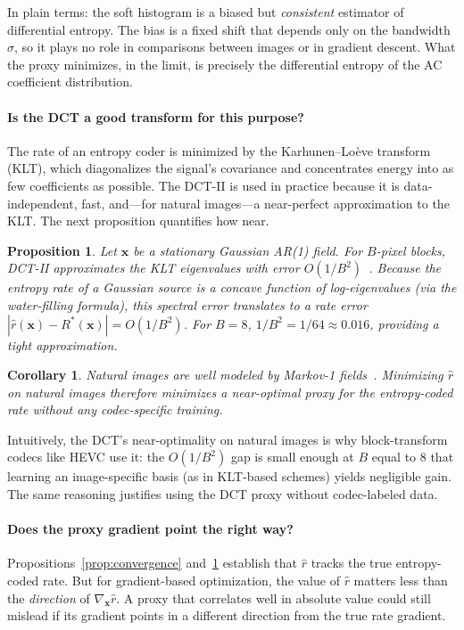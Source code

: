 \documentclass{article}
\newtheorem{proposition}{Proposition}
\newtheorem{corollary}{Corollary}
\theoremstyle{definition}
\newcommand{\bx}{\boldsymbol{x}}
\begin{document}
In plain terms: the soft histogram is a biased but \emph{consistent} estimator of differential entropy.
The bias is a fixed shift that depends only on the bandwidth $\sigma$, so it plays no role in comparisons between images or in gradient descent.
What the proxy minimizes, in the limit, is precisely the differential entropy of the AC coefficient distribution.

\paragraph{Is the DCT a good transform for this purpose?}
The rate of an entropy coder is minimized by the Karhunen--Lo\`eve transform (KLT), which diagonalizes the signal's covariance and concentrates energy into as few coefficients as possible.
The DCT-II is used in practice because it is data-independent, fast, and---for natural images---a near-perfect approximation to the KLT.
The next proposition quantifies how near.

\begin{proposition}
\label{prop:klt}
Let $\bx$ be a stationary Gaussian AR(1) field.
For $B$-pixel blocks, DCT-II approximates the KLT eigenvalues with error $O(1/B^2)$~\citep{clarke1985transform}.
Because the entropy rate of a Gaussian source is a concave function of log-eigenvalues (via the water-filling formula), this spectral error translates to a rate error $|\hat{r}(\bx) - R^*(\bx)| = O(1/B^2)$.
For $B=8$, $1/B^2 = 1/64 \approx 0.016$, providing a tight approximation.
\end{proposition}

\begin{corollary}
Natural images are well modeled by Markov-1 fields~\citep{habibi1971comparison}.
Minimizing $\hat{r}$ on natural images therefore minimizes a near-optimal proxy for the entropy-coded rate without any codec-specific training.
\end{corollary}

Intuitively, the DCT's near-optimality on natural images is why block-transform codecs like HEVC use it: the $O(1/B^2)$ gap is small enough at $B$ equal to $8$ that learning an image-specific basis (as in KLT-based schemes) yields negligible gain.
The same reasoning justifies using the DCT proxy without codec-labeled data.

\paragraph{Does the proxy gradient point the right way?}
Propositions~\ref{prop:convergence} and~\ref{prop:klt} establish that $\hat{r}$ tracks the true entropy-coded rate.
But for gradient-based optimization, the value of $\hat{r}$ matters less than the \emph{direction} of $\nabla_{\bx}\hat{r}$.
A proxy that correlates well in absolute value could still mislead if its gradient points in a different direction from the true rate gradient.
\end{document}
